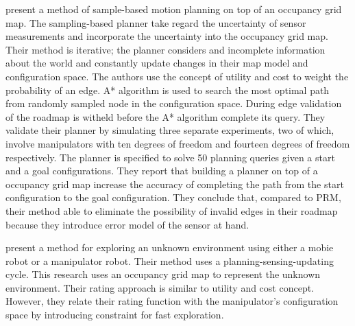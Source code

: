 \textcite{Burns2007} present a method of sample-based motion planning on top of an
occupancy grid map. The sampling-based planner take regard the uncertainty of sensor
measurements and incorporate the uncertainty into the occupancy grid map. Their method is
iterative; the planner considers and incomplete information about the world and constantly
update changes in their map model and configuration space. The authors use the concept of
utility and cost to weight the probability of an edge. A* algorithm is used to search the most
optimal path from randomly sampled node in the configuration space. During edge validation of
the roadmap is witheld before the A* algorithm complete its query. They validate their planner
by simulating three separate experiments, two of which, involve manipulators with ten degrees
of freedom and fourteen degrees of freedom respectively. The planner is specified to solve 50
planning queries given a start and a goal configurations. They report that building a planner on
top of a occupancy grid map increase the accuracy of completing the path from the start
configuration to the goal configuration. They conclude that, compared to PRM, their method
able to eliminate the possibility of invalid edges in their roadmap because they introduce error
model of the sensor at hand.

\textcite{Kruse1996} present a method for exploring an unknown environment using
either a mobie robot or a manipulator robot. Their method uses a planning-sensing-updating
cycle. This research uses an occupancy grid map to represent the unknown environment.
Their rating approach is similar to \textcite{Burns2007} utility and cost concept. However, they
relate their rating function with the manipulator's configuration space by introducing constraint
for fast exploration.

